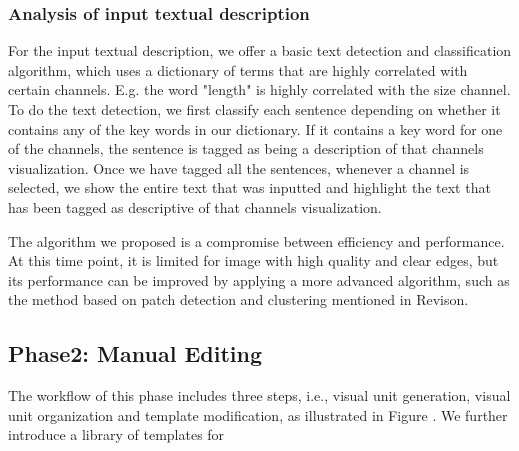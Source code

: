 \subsubsection{Analysis of input textual description}
For the input textual description, we offer a basic text detection and classification algorithm, which uses a dictionary of terms that are highly correlated with certain channels. E.g. the word "length" is highly correlated with the size channel. To do the text detection, we first classify each sentence depending on whether it contains any of the key words in our dictionary. If it contains a key word for one of the channels, the sentence is tagged as being a description of that channels visualization. Once we have tagged all the sentences, whenever a channel is selected, we show the entire text that was inputted and highlight the text that has been tagged as descriptive of that channels visualization.

The algorithm we proposed is a compromise between efficiency and performance. At this time point, it is limited for image with high quality and clear edges, but its performance can be improved by applying a more advanced algorithm, such as the method based on patch detection and clustering mentioned in Revison\cite{savva_revision:_2011}.

\subsection{Phase2: Manual Editing}
The workflow of this phase includes three steps, i.e., visual unit generation, visual unit organization and template modification, as illustrated in Figure . We further introduce a library of templates for 

